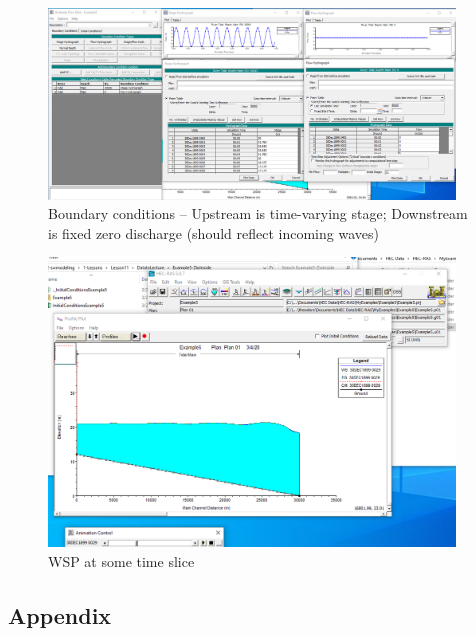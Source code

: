 \begin{figure}[h!] %
   \centering
   \includegraphics[width=4.25in]{ex5bc.png} 
   \caption{Boundary conditions -- Upstream is time-varying stage; Downstream is fixed zero discharge (should reflect incoming waves)}
   \label{fig:ex5bc}
\end{figure}

\begin{figure}[h!] %
   \centering
   \includegraphics[width=4.25in]{ex5wsp.png} 
   \caption{WSP at some time slice}
   \label{fig:ex5wsp}
\end{figure}

\subsection{Appendix}
